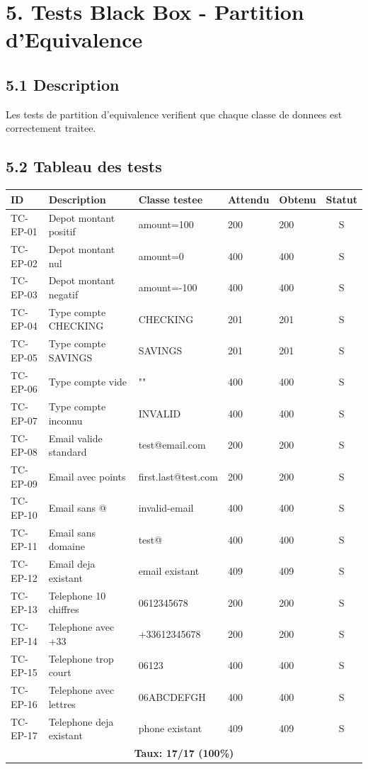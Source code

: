 \documentclass[12pt,a4paper]{article}
\begin{document}
\newpage

\section*{5. Tests Black Box - Partition d'Equivalence}

\subsection*{5.1 Description}
Les tests de partition d'equivalence verifient que chaque classe de donnees est correctement traitee.

\subsection*{5.2 Tableau des tests}

\begin{longtable}{|p{2.2cm}|p{4cm}|p{4cm}|p{2.5cm}|p{2.5cm}|c|}
\hline
\rowcolor[gray]{0.9}
\textbf{ID} & \textbf{Description} & \textbf{Classe testee} & \textbf{Attendu} & \textbf{Obtenu} & \textbf{Statut} \\
\hline
TC-EP-01 & Depot montant positif & amount=100 & 200 & 200 & S \\
\hline
TC-EP-02 & Depot montant nul & amount=0 & 400 & 400 & S \\
\hline
TC-EP-03 & Depot montant negatif & amount=-100 & 400 & 400 & S \\
\hline
TC-EP-04 & Type compte CHECKING & CHECKING & 201 & 201 & S \\
\hline
TC-EP-05 & Type compte SAVINGS & SAVINGS & 201 & 201 & S \\
\hline
TC-EP-06 & Type compte vide & "" & 400 & 400 & S \\
\hline
TC-EP-07 & Type compte inconnu & INVALID & 400 & 400 & S \\
\hline
TC-EP-08 & Email valide standard & test@email.com & 200 & 200 & S \\
\hline
TC-EP-09 & Email avec points & first.last@test.com & 200 & 200 & S \\
\hline
TC-EP-10 & Email sans @ & invalid-email & 400 & 400 & S \\
\hline
TC-EP-11 & Email sans domaine & test@ & 400 & 400 & S \\
\hline
TC-EP-12 & Email deja existant & email existant & 409 & 409 & S \\
\hline
TC-EP-13 & Telephone 10 chiffres & 0612345678 & 200 & 200 & S \\
\hline
TC-EP-14 & Telephone avec +33 & +33612345678 & 200 & 200 & S \\
\hline
TC-EP-15 & Telephone trop court & 06123 & 400 & 400 & S \\
\hline
TC-EP-16 & Telephone avec lettres & 06ABCDEFGH & 400 & 400 & S \\
\hline
TC-EP-17 & Telephone deja existant & phone existant & 409 & 409 & S \\
\hline
\multicolumn{6}{|c|}{\textbf{Taux: 17/17 (100\%)}} \\
\hline
\end{longtable}
\end{document}
